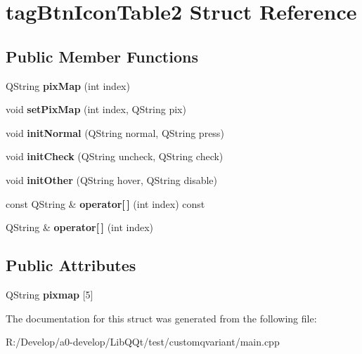 \hypertarget{structtag_btn_icon_table2}{}\section{tag\+Btn\+Icon\+Table2 Struct Reference}
\label{structtag_btn_icon_table2}
\subsection*{Public Member Functions}
\begin{DoxyCompactItemize}
\item 
\mbox{\label{structtag_btn_icon_table2_ae813288b2f5243654c617e4c1198d2cc}} 
Q\+String {\bfseries pix\+Map} (int index)
\item 
\mbox{\label{structtag_btn_icon_table2_ad324641b4be9a7e205531e5d918a1973}} 
void {\bfseries set\+Pix\+Map} (int index, Q\+String pix)
\item 
\mbox{\label{structtag_btn_icon_table2_a77c1644e9549b8222bd4a7e663191869}} 
void {\bfseries init\+Normal} (Q\+String normal, Q\+String press)
\item 
\mbox{\label{structtag_btn_icon_table2_a3838ae04e3c1ebed5335a1f70232300b}} 
void {\bfseries init\+Check} (Q\+String uncheck, Q\+String check)
\item 
\mbox{\label{structtag_btn_icon_table2_a120385a7a68e65a036165cd21b85fc7c}} 
void {\bfseries init\+Other} (Q\+String hover, Q\+String disable)
\item 
\mbox{\label{structtag_btn_icon_table2_a1d712ace32c1c597037c4b6fe9ac3fdb}} 
const Q\+String \& {\bfseries operator\mbox{[}$\,$\mbox{]}} (int index) const
\item 
\mbox{\label{structtag_btn_icon_table2_a6efaea64ec213d64bde807765c5427d3}} 
Q\+String \& {\bfseries operator\mbox{[}$\,$\mbox{]}} (int index)
\end{DoxyCompactItemize}
\subsection*{Public Attributes}
\begin{DoxyCompactItemize}
\item 
\mbox{\label{structtag_btn_icon_table2_a565fee3d82709800d73e14879ab044ba}} 
Q\+String {\bfseries pixmap} \mbox{[}5\mbox{]}
\end{DoxyCompactItemize}


The documentation for this struct was generated from the following file\+:\begin{DoxyCompactItemize}
\item 
R\+:/\+Develop/a0-\/develop/\+Lib\+Q\+Qt/test/customqvariant/main.\+cpp\end{DoxyCompactItemize}
